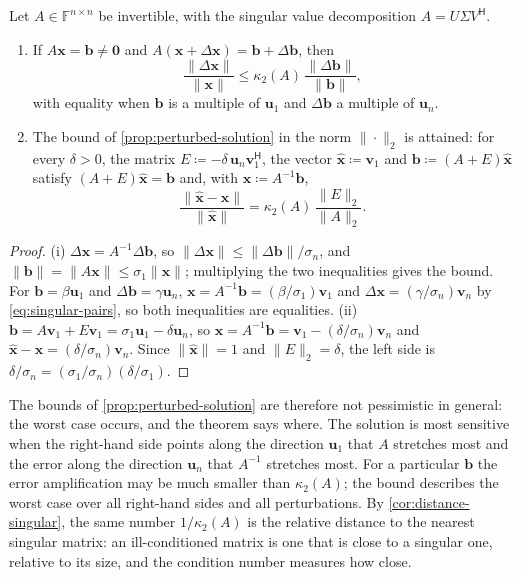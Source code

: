 \begin{theorem}
\label{thm:kappa-attained}
Let $A\in\mathbb F^{n\times n}$ be invertible, with the singular value decomposition $A=U\Sigma V^{\mathsf H}$.
\begin{enumerate}
\item If $A\mathbf x=\mathbf b\ne\mathbf 0$ and $A(\mathbf x+\Delta\mathbf x)=\mathbf b+\Delta\mathbf b$, then
\[
\frac{\|\Delta\mathbf x\|}{\|\mathbf x\|}\le\kappa_2(A)\,\frac{\|\Delta\mathbf b\|}{\|\mathbf b\|},
\]
with equality when $\mathbf b$ is a multiple of $\mathbf u_1$ and $\Delta\mathbf b$ a multiple of $\mathbf u_n$.
\item The bound of \cref{prop:perturbed-solution} in the norm $\|\cdot\|_2$ is attained: for every $\delta>0$, the matrix $E\coloneqq-\delta\,\mathbf u_n\mathbf v_1^{\mathsf H}$, the vector $\hat{\mathbf x}\coloneqq\mathbf v_1$ and $\mathbf b\coloneqq(A+E)\hat{\mathbf x}$ satisfy $(A+E)\hat{\mathbf x}=\mathbf b$ and, with $\mathbf x\coloneqq A^{-1}\mathbf b$,
\[
\frac{\|\hat{\mathbf x}-\mathbf x\|}{\|\hat{\mathbf x}\|}=\kappa_2(A)\,\frac{\|E\|_2}{\|A\|_2}.
\]
\end{enumerate}
\end{theorem}

\begin{proof}
(i) $\Delta\mathbf x=A^{-1}\Delta\mathbf b$, so $\|\Delta\mathbf x\|\le\|\Delta\mathbf b\|/\sigma_n$, and $\|\mathbf b\|=\|A\mathbf x\|\le\sigma_1\|\mathbf x\|$; multiplying the two inequalities gives the bound. For $\mathbf b=\beta\mathbf u_1$ and $\Delta\mathbf b=\gamma\mathbf u_n$, $\mathbf x=A^{-1}\mathbf b=(\beta/\sigma_1)\mathbf v_1$ and $\Delta\mathbf x=(\gamma/\sigma_n)\mathbf v_n$ by \eqref{eq:singular-pairs}, so both inequalities are equalities. (ii) $\mathbf b=A\mathbf v_1+E\mathbf v_1=\sigma_1\mathbf u_1-\delta\mathbf u_n$, so $\mathbf x=A^{-1}\mathbf b=\mathbf v_1-(\delta/\sigma_n)\mathbf v_n$ and $\hat{\mathbf x}-\mathbf x=(\delta/\sigma_n)\mathbf v_n$. Since $\|\hat{\mathbf x}\|=1$ and $\|E\|_2=\delta$, the left side is $\delta/\sigma_n=(\sigma_1/\sigma_n)(\delta/\sigma_1)$.
\end{proof}

The bounds of \cref{prop:perturbed-solution} are therefore not pessimistic in general: the worst case occurs, and the theorem says where. The solution is most sensitive when the right-hand side points along the direction $\mathbf u_1$ that $A$ stretches most and the error along the direction $\mathbf u_n$ that $A^{-1}$ stretches most. For a particular $\mathbf b$ the error amplification may be much smaller than $\kappa_2(A)$; the bound describes the worst case over all right-hand sides and all perturbations. By \cref{cor:distance-singular}, the same number $1/\kappa_2(A)$ is the relative distance to the nearest singular matrix: an ill-conditioned matrix is one that is close to a singular one, relative to its size, and the condition number measures how close.

